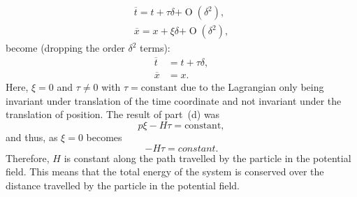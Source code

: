 \begin{align*}
	\overline{t} = t + \tau\delta + \mathrel{O}(\delta^2),\\
	\overline{x} = x + \xi\delta + \mathrel{O}(\delta^2),
\end{align*}
become (dropping the order $\delta^2$ terms):
\begin{align*}
	\overline{t} &= t + \tau\delta,\\
	\overline{x} &= x.
\end{align*}
Here, $\xi=0$ and $\tau \ne 0$ with $\tau=\text{constant}$ due to the Lagrangian only being invariant under translation of the time coordinate and not invariant under the translation of position. The result of part~(d) was
\[
	p\xi - H\tau = \text{constant},
\]
and thus, as $\xi=0$ becomes
\[
	-H\tau = constant.
\]
Therefore, $H$ is constant along the path travelled by the particle in the potential field.  This means that the total energy of the system is conserved over the distance travelled by the particle in the potential field.


